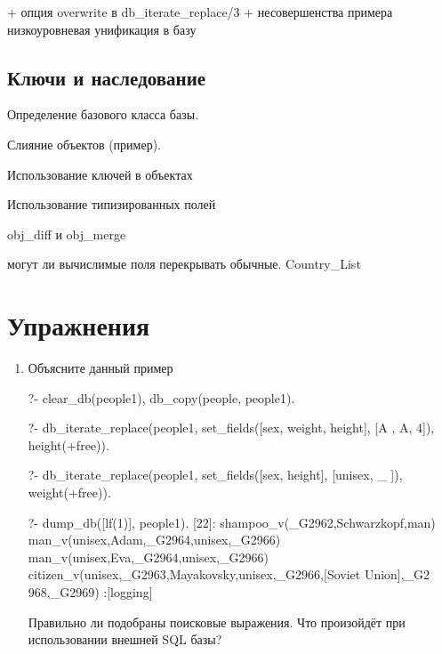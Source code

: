 \documentclass[a4paper]{book}
\begin{document}
+ опция overwrite в db_iterate_replace/3 + несовершенства примера
низкоуровневая унификация в базу


\subsection{Ключи и наследование}
\label{keys_inheritance}

Определение базового класса базы.

Слияние объектов (пример).


Использование ключей в объектах

Использование типизированных полей

obj\_diff и obj\_merge

могут ли вычислимые поля перекрывать обычные. Country\_List

\section{Упражнения}

\begin{enumerate}
\item Объясните данный пример

\begin{example}{}{}
?- clear_db(people1), db_copy(people, people1).

?- db_iterate_replace(people1, set_fields([sex, weight, height], [A
, A, 4]), height(+free)).                                         

?- db_iterate_replace(people1, set_fields([sex, height], [unisex, _
]), weight(+free)).                                               

?- dump_db([lf(1)], people1).
[22]: shampoo_v(_G2962,Schwarzkopf,man) 
man_v(unisex,Adam,_G2964,unisex,_G2966) 
man_v(unisex,Eva,_G2964,unisex,_G2966) 
citizen_v(unisex,_G2963,Mayakovsky,unisex,_G2966,[Soviet Union],_G2
968,_G2969)                                                       
 :[logging]
\end{example}

Правильно ли подобраны поисковые выражения. Что произойдёт при
использовании внешней SQL базы?

\end{enumerate}
\end{document}
